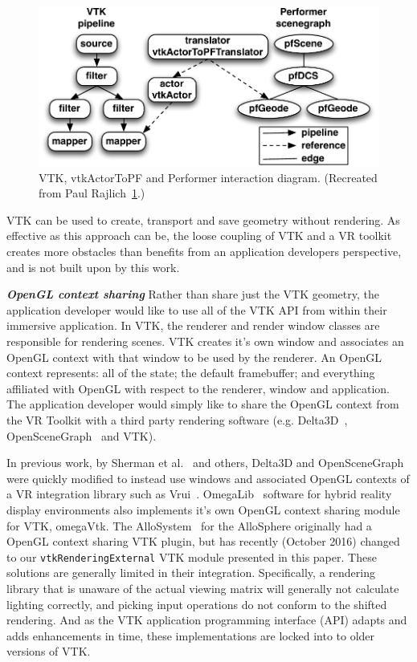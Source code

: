 \begin{figure}[h!]
  \centering
  \includegraphics[width=\linewidth]{images/vtkActorToPF.pdf}
  \caption{VTK, vtkActorToPF and Performer interaction diagram. (Recreated from Paul Rajlich~\ref{fig:vtkActorToPF}.)}
  \label{fig:vtkActorToPF}
\end{figure}

VTK can be used to create, transport and save geometry without rendering. As effective as this approach can be, the loose coupling of VTK and a VR toolkit creates more obstacles than benefits from an application developers perspective, and is not built upon by this work.

\textbf{\textit{OpenGL context sharing}} Rather than share just the VTK geometry, the application developer would like to use all of the VTK API from within their immersive application.
In VTK, the renderer and render window classes are responsible for rendering scenes.
VTK creates it's own window and associates an OpenGL context with that window to be used by the renderer.
An OpenGL context represents: all of the state; the default framebuffer; and everything affiliated with OpenGL with respect to the renderer, window and application.
The application developer would simply like to share the OpenGL context from the VR Toolkit with a third party rendering software (e.g. Delta3D~\cite{McDowell:2006}, OpenSceneGraph~\cite{Wang:2010} and VTK). 

In previous work, by Sherman et al.~\cite{Sherman:2010} and others, Delta3D
and OpenSceneGraph were quickly modified to instead use windows and associated
OpenGL contexts of a VR integration library such as Vrui~\cite{Kreylos:2006}.  
OmegaLib~\cite{Febretti:2014} software for hybrid reality display environments also implements it's own OpenGL context sharing module for VTK, omegaVtk. The AlloSystem~\cite{Amatriain:2009} for the AlloSphere originally had a OpenGL context sharing VTK plugin, but has recently (October 2016) changed to our \texttt{vtkRenderingExternal} VTK module presented in this paper.
These solutions are generally limited in their integration.
Specifically, a rendering library that is unaware of the actual
viewing matrix will generally not calculate lighting correctly, and
picking input operations do not conform to the shifted rendering. And as the VTK application programming interface (API) adapts and adds enhancements in time, these implementations are locked into to older versions of VTK.

